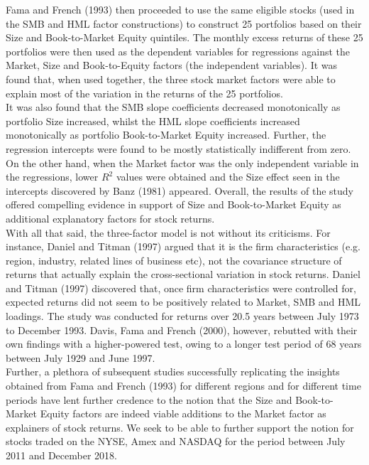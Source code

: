 \documentclass[12pt]{article}
\begin{document}
	\noindent Fama and French (1993) then proceeded to use the same eligible stocks (used in the SMB and HML factor constructions) to construct 25 portfolios based on their Size and Book-to-Market Equity quintiles. The monthly excess returns of these 25 portfolios were then used as the dependent variables for regressions against the Market, Size and Book-to-Equity factors (the independent variables). It was found that, when used together, the three stock market factors were able to explain most of the variation in the returns of the 25 portfolios.\\
	
	\noindent It was also found that the SMB slope coefficients decreased monotonically as portfolio Size increased, whilst the HML slope coefficients increased monotonically as portfolio Book-to-Market Equity increased. Further, the regression intercepts were found to be mostly statistically indifferent from zero. On the other hand, when the Market factor was the only independent variable in the regressions, lower $R^2$ values were obtained and the Size effect seen in the intercepts discovered by Banz (1981) appeared. Overall, the results of the study offered compelling evidence in support of Size and Book-to-Market Equity as additional explanatory factors for stock returns.\\
	
	\noindent With all that said, the three-factor model is not without its criticisms. For instance, Daniel and Titman (1997) argued that it is the firm characteristics (e.g. region, industry, related lines of business etc), not the covariance structure of returns that actually explain the cross-sectional variation in stock returns. Daniel and Titman (1997) discovered that, once firm
	characteristics were controlled for, expected returns did not seem to be positively related to Market, SMB and HML loadings. The study was conducted for returns over 20.5 years between July 1973 to December 1993. Davis, Fama and French (2000), however, rebutted with their own findings with a higher-powered test, owing to a longer test period of 68 years between July 1929 and June 1997.\\
	
	\noindent Further, a plethora of subsequent studies successfully replicating the insights obtained from Fama and French (1993) for different regions and for different time periods have lent further credence to the notion that the Size and Book-to-Market Equity factors are indeed viable additions to the Market factor as explainers of stock returns. We seek to be able to further support the notion for stocks traded on the NYSE, Amex and NASDAQ for the period between July 2011 and December 2018.\\
	
\end{document}
